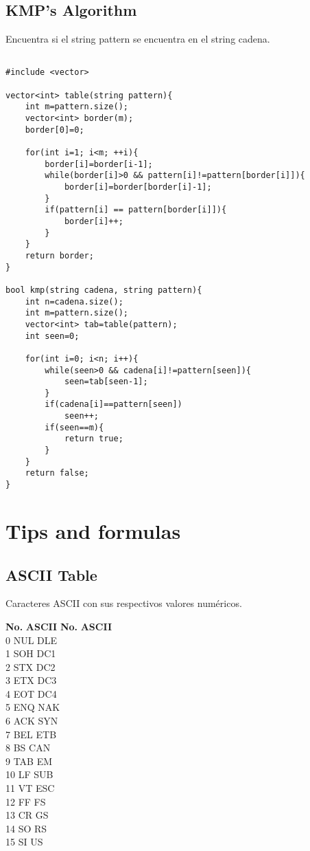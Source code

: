 \documentclass[11pt,letterpaper,twocolumn,twosided]{article}
\begin{document}
\subsection{KMP's Algorithm}
Encuentra si el string pattern se encuentra en el string cadena.
\begin{lstlisting}

#include <vector>

vector<int> table(string pattern){
	int m=pattern.size();
	vector<int> border(m);
	border[0]=0;

	for(int i=1; i<m; ++i){
		border[i]=border[i-1];
		while(border[i]>0 && pattern[i]!=pattern[border[i]]){
			border[i]=border[border[i]-1];
		}
		if(pattern[i] == pattern[border[i]]){
			border[i]++;
		}
	}
	return border;
}

bool kmp(string cadena, string pattern){
	int n=cadena.size();
	int m=pattern.size();
	vector<int> tab=table(pattern);
	int seen=0;

	for(int i=0; i<n; i++){
		while(seen>0 && cadena[i]!=pattern[seen]){
			seen=tab[seen-1];
		}
		if(cadena[i]==pattern[seen])
			seen++;
		if(seen==m){
			return true;
		}
	}
	return false;
}
\end{lstlisting}

\section{Tips and formulas}

\subsection{ASCII Table}
Caracteres ASCII con sus respectivos valores num\'ericos.


\begin{tabbing}
\textbf{No.}\hspace{1cm} \=  \textbf{ASCII}\hspace{2cm} \= \textbf{No.}\hspace{1cm} \= \textbf{ASCII}\hspace{2cm}  \\ 
0 \> NUL  \> DLE \\
1 \> SOH  \> DC1 \\
2 \> STX  \> DC2 \\
3 \> ETX  \> DC3 \\
4 \> EOT  \> DC4 \\
5 \> ENQ  \> NAK \\
6 \> ACK  \> SYN \\
7 \> BEL  \> ETB \\
8 \> BS  \> CAN \\
9 \> TAB  \> EM \\
10 \> LF  \> SUB \\
11 \> VT  \> ESC \\
12 \> FF  \> FS \\
13 \> CR  \> GS \\
14 \> SO  \> RS \\
15 \> SI  \> US \\ 
\end{tabbing}
\end{document}
